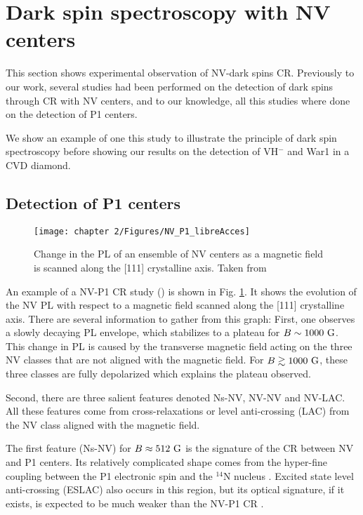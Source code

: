 \documentclass[a4paper, 11pt]{report}
\begin{document}
\section{Dark spin spectroscopy with NV centers}
This section shows experimental observation of NV-dark spins CR. Previously to our work, several studies \citep{van1989cross, holliday1989optical, epstein2005anisotropic, armstrong2010nv,   hall2016detection, wickenbrock2016microwave,  wood2016wide,  alfasi2019detection, lazda2021cross} had been performed on the detection of dark spins through CR with NV centers, and to our knowledge, all this studies where done on the detection of P1 centers. 

We show an example of one this study to illustrate the principle of dark spin spectroscopy before showing our results on the detection of VH$^-$ and War1 in a CVD diamond.

\subsection{Detection of P1 centers}

\begin{figure}[h]
\centering
\texttt{[image: chapter 2/Figures/NV\_P1\_libreAcces]}
\caption{Change in the PL of an ensemble of NV centers as a magnetic field is scanned along the [111] crystalline axis. Taken from \citep{armstrong2010nv}}
\label{CR P1 exp}
\end{figure}

An example of a NV-P1 CR study (\citep{armstrong2010nv}) is shown in Fig. \ref{CR P1 exp}. It shows the evolution of the NV PL with respect to a magnetic field scanned along the [111] crystalline axis. There are several information to gather from this graph: First, one observes a slowly decaying PL envelope, which stabilizes to a plateau for $B\sim 1000\ \rm G$. This change in PL is caused by the transverse magnetic field acting on the three NV classes that are not aligned with the magnetic field. For $B \gtrsim 1000\ \rm G$, these three classes are fully depolarized which explains the plateau observed.

Second, there are three salient features denoted Ns-NV, NV-NV and NV-LAC. All these features come from cross-relaxations or level anti-crossing (LAC) from the NV class aligned with the magnetic field.

The first feature (Ns-NV) for $B\approx 512 \ \rm G$ is the signature of the CR between NV and P1 centers. Its relatively complicated shape comes from the hyper-fine coupling between the P1 electronic spin and the $^{14}$N nucleus \citep{lazda2021cross}. Excited state level anti-crossing (ESLAC) also occurs in this region, but its optical signature, if it exists, is expected to be much weaker than the NV-P1 CR \citep{zheng2017level}.
\end{document}
